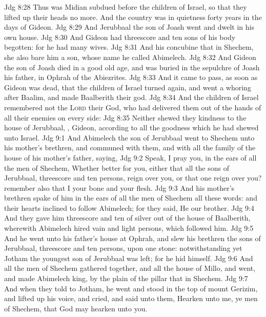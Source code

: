\vs Jdg 8:28 Thus was Midian subdued before the children of Israel, so that they lifted up their heads no more. And the country was in quietness forty years in the days of Gideon.
\vs Jdg 8:29 And Jerubbaal the son of Joash went and dwelt in his own house.
\vs Jdg 8:30 And Gideon had threescore and ten sons of his body begotten: for he had many wives.
\vs Jdg 8:31 And his concubine that  in Shechem, she also bare him a son, whose name he called Abimelech.
\vs Jdg 8:32 And Gideon the son of Joash died in a good old age, and was buried in the sepulchre of Joash his father, in Ophrah of the Abiezrites.
\vs Jdg 8:33 And it came to pass, as soon as Gideon was dead, that the children of Israel turned again, and went a whoring after Baalim, and made Baalberith their god.
\vs Jdg 8:34 And the children of Israel remembered not the \textsc{Lord} their God, who had delivered them out of the hands of all their enemies on every side:
\vs Jdg 8:35 Neither shewed they kindness to the house of Jerubbaal, , Gideon, according to all the goodness which he had shewed unto Israel.
\vs Jdg 9:1 And Abimelech the son of Jerubbaal went to Shechem unto his mother's brethren, and communed with them, and with all the family of the house of his mother's father, saying,
\vs Jdg 9:2 Speak, I pray you, in the ears of all the men of Shechem, Whether  better for you, either that all the sons of Jerubbaal,  threescore and ten persons, reign over you, or that one reign over you? remember also that I  your bone and your flesh.
\vs Jdg 9:3 And his mother's brethren spake of him in the ears of all the men of Shechem all these words: and their hearts inclined to follow Abimelech; for they said, He  our brother.
\vs Jdg 9:4 And they gave him threescore and ten  of silver out of the house of Baalberith, wherewith Abimelech hired vain and light persons, which followed him.
\vs Jdg 9:5 And he went unto his father's house at Ophrah, and slew his brethren the sons of Jerubbaal,  threescore and ten persons, upon one stone: notwithstanding yet Jotham the youngest son of Jerubbaal was left; for he hid himself.
\vs Jdg 9:6 And all the men of Shechem gathered together, and all the house of Millo, and went, and made Abimelech king, by the plain of the pillar that  in Shechem.
\vs Jdg 9:7 And when they told  to Jotham, he went and stood in the top of mount Gerizim, and lifted up his voice, and cried, and said unto them, Hearken unto me, ye men of Shechem, that God may hearken unto you.
